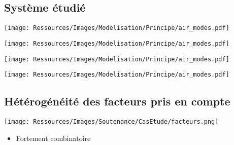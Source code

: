 \documentclass[xcolor=x11names, compress, 11pt]{beamer}
\begin{document}
\subsection{Système étudié}
\begin{frame}[c]
    \vfill
    \texttt{[image: Ressources/Images/Modelisation/Principe/air\_modes.pdf]}
    \vfill
\end{frame}
\begin{frame}[c]
    \vfill
    \texttt{[image: Ressources/Images/Modelisation/Principe/air\_modes.pdf]}
    \vfill
\end{frame}
\begin{frame}[c]
    \vfill
    \texttt{[image: Ressources/Images/Modelisation/Principe/air\_modes.pdf]}
    \vfill
\end{frame}
\begin{frame}[c]
    \vfill
    \texttt{[image: Ressources/Images/Modelisation/Principe/air\_modes.pdf]}
    \vfill
\end{frame}



\subsection{Hétérogénéité des facteurs pris en compte}
\begin{frame}[c]
    \vfill
    \texttt{[image: Ressources/Images/Soutenance/CasEtude/facteurs.png]}
    \vfill
    \begin{itemize}
        \item Fortement combinatoire
    \end{itemize}

\end{frame}


\end{document}
